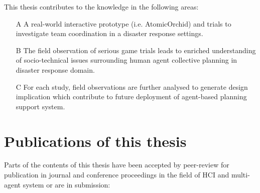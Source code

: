 This thesis contributes to the knowledge in the following areas: \\
\begin{enumerate}
  \item[A] A real-world interactive prototype (i.e. AtomicOrchid) and trials to investigate team coordination in a disaster response settings.
  \item[B] The field observation of serious game trials leads to enriched understanding of socio-technical issues surrounding human agent collective planning in disaster response domain.
  \item[C] For each study, field observations are further analysed to generate design implication which contribute to future deployment of agent-based planning support system. 
\end{enumerate}


\section{Publications of this thesis} 
Parts of the contents of this thesis have been accepted by peer-review for publication in journal and conference proceedings in the field of HCI and multi-agent system or are in submission:\\


